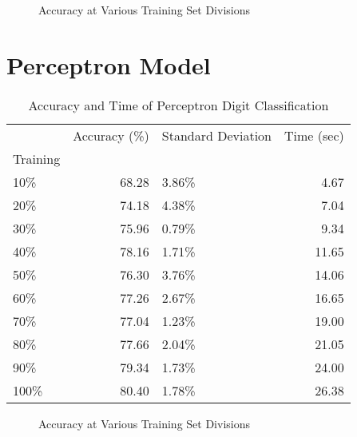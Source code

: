 \documentclass[10pt,parskip=half,
toc=sectionentrywithdots,
bibliography=totocnumbered,
captions=tableheading,numbers=noendperiod]{scrartcl}
\begin{document}
\begin{figure}[H]\begin{center}\end{center}\caption{Accuracy at Various Training Set Divisions}\label{fig:flabel}\end{figure}

\hypertarget{perceptron-model}{%
\section{Perceptron Model}\label{perceptron-model}}

\begin{table}[H]
\caption{Accuracy and Time of Perceptron Digit Classification}\label{tbl:tlabel}
\centering
\begin{adjustbox}{max width=\textwidth}
\begin{tabular}{lrlr}
\toprule
{} &  Accuracy (\%) & Standard Deviation &  Time (sec) \\
Training &               &                    &             \\
\midrule
10\%      &         68.28 &              3.86\% &        4.67 \\
20\%      &         74.18 &              4.38\% &        7.04 \\
30\%      &         75.96 &              0.79\% &        9.34 \\
40\%      &         78.16 &              1.71\% &       11.65 \\
50\%      &         76.30 &              3.76\% &       14.06 \\
60\%      &         77.26 &              2.67\% &       16.65 \\
70\%      &         77.04 &              1.23\% &       19.00 \\
80\%      &         77.66 &              2.04\% &       21.05 \\
90\%      &         79.34 &              1.73\% &       24.00 \\
100\%     &         80.40 &              1.78\% &       26.38 \\
\bottomrule
\end{tabular}

\end{adjustbox}
\end{table}

\begin{figure}[H]\begin{center}\end{center}\caption{Accuracy at Various Training Set Divisions}\label{fig:flabel}\end{figure}
\end{document}
